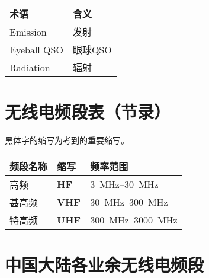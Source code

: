 \begin{longtable}[l]{ll}
	\textbf{术语} & \textbf{含义} \\
	Emission    & 发射          \\
	Eyeball QSO & 眼球QSO       \\
	Radiation   & 辐射          \\
\end{longtable}

\newpage

\section{无线电频段表（节录）}

黑体字的缩写为考到的重要缩写。

\begin{longtable}[c]{|l|l|l|}
	\hline
	\textbf{频段名称} & \textbf{缩写}  & \textbf{频率范围}                               \\
	\hline
	高频            & \textbf{HF}  & \qtyrange[range-phrase=--]{3}{30}{\MHz}     \\
	\hline
	甚高频           & \textbf{VHF} & \qtyrange[range-phrase=--]{30}{300}{\MHz}   \\
	\hline
	特高频           & \textbf{UHF} & \qtyrange[range-phrase=--]{300}{3000}{\MHz} \\
	\hline
\end{longtable}

\newpage

\section{中国大陆各业余无线电频段}

